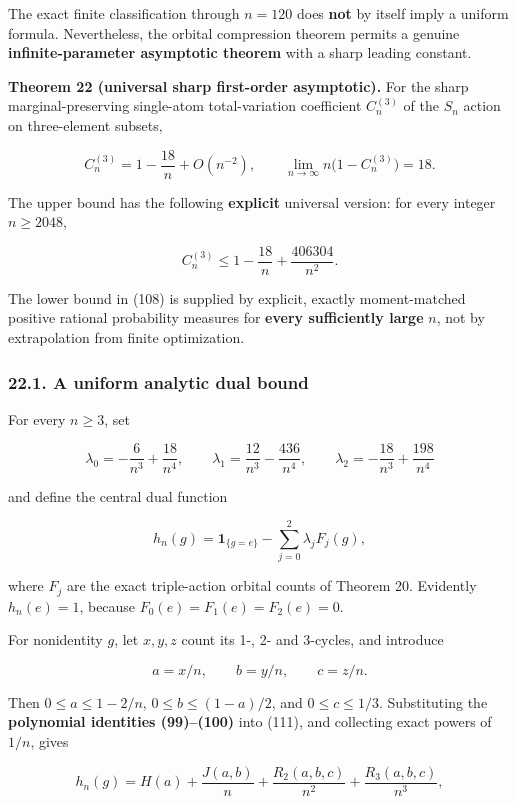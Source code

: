 \documentclass[
  11pt,
]{article}
\begin{document}
The exact finite classification through \(n=120\) does \textbf{not} by
itself imply a uniform formula. Nevertheless, the orbital compression
theorem permits a genuine \textbf{infinite-parameter asymptotic theorem}
with a sharp leading constant.

\textbf{Theorem 22 (universal sharp first-order asymptotic).} For the
sharp marginal-preserving single-atom total-variation coefficient
\(C_n^{(3)}\) of the \(S_n\) action on three-element subsets,

\[
\boxed{\displaystyle
C_n^{(3)}=1-\frac{18}{n}+O(n^{-2}),
\qquad
\lim_{n\to\infty}n\bigl(1-C_n^{(3)}\bigr)=18.} \tag{108}
\]

The upper bound has the following \textbf{explicit} universal version:
for every integer \(n\ge2048\),

\[
C_n^{(3)}\le
1-\frac{18}{n}+\frac{406304}{n^2}. \tag{109}
\]

The lower bound in (108) is supplied by explicit, exactly moment-matched
positive rational probability measures for \textbf{every sufficiently
large} \(n\), not by extrapolation from finite optimization.

\subsubsection{22.1. A uniform analytic dual
bound}\label{a-uniform-analytic-dual-bound}

For every \(n\ge3\), set

\[
\lambda_0=-\frac6{n^3}+\frac{18}{n^4},\qquad
\lambda_1=\frac{12}{n^3}-\frac{436}{n^4},\qquad
\lambda_2=-\frac{18}{n^3}+\frac{198}{n^4}
\tag{110}
\]

and define the central dual function

\[
h_n(g)=\mathbf1_{\{g=e\}}-\sum_{j=0}^2\lambda_jF_j(g),
\tag{111}
\]

where \(F_j\) are the exact triple-action orbital counts of Theorem 20.
Evidently \(h_n(e)=1\), because \(F_0(e)=F_1(e)=F_2(e)=0\).

For nonidentity \(g\), let \(x,y,z\) count its 1-, 2- and 3-cycles, and
introduce

\[
a=x/n,\qquad b=y/n,\qquad c=z/n.
\]

Then \(0\le a\le1-2/n\), \(0\le b\le(1-a)/2\), and \(0\le c\le1/3\).
Substituting the \textbf{polynomial identities (99)--(100)} into (111),
and collecting exact powers of \(1/n\), gives

\[
h_n(g)=H(a)+\frac{J(a,b)}n+\frac{R_2(a,b,c)}{n^2}
                   +\frac{R_3(a,b,c)}{n^3}, \tag{112}
\]
\end{document}
